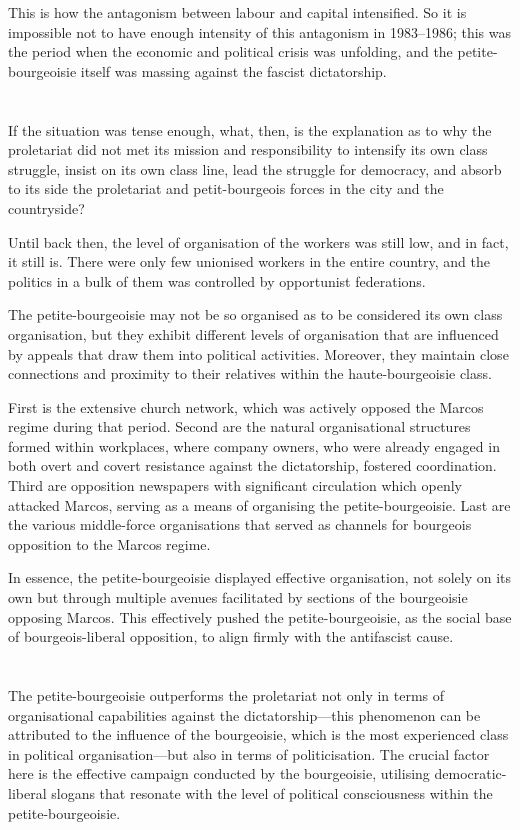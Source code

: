 This is how the antagonism between labour and capital intensified. 
So it is impossible not to have enough 
intensity of this antagonism in 1983--1986;
this was the period when the economic and political crisis was unfolding,
and the petite-bourgeoisie itself was massing against the fascist dictatorship.

\section{}
If the situation was tense enough, 
what, then, is the explanation as to 
why the proletariat did not met its mission and responsibility 
to intensify its own class struggle, 
insist on its own class line, 
lead the struggle for democracy, 
and absorb to its side 
the proletariat and petit-bourgeois forces 
in the city and the countryside?

Until back then, 
the level of organisation of the workers was still low, 
and in fact, it still is. 
There were only few unionised workers in the entire country,
and the politics in a bulk of them was controlled by opportunist federations.

The petite-bourgeoisie may not be so organised 
as to be considered its own class organisation,
but they exhibit different levels of organisation 
that are influenced by appeals 
that draw them into political activities. 
Moreover, 
they maintain close connections and proximity 
to their relatives within the haute-bourgeoisie class.

First is the extensive church network,
which was actively opposed the Marcos regime during that period. 
Second are the natural organisational structures 
formed within workplaces, 
where company owners, who were already engaged 
in both overt and covert resistance 
against the dictatorship, fostered coordination. 
Third are opposition newspapers 
with significant circulation which openly attacked Marcos, 
serving as a means of organising the petite-bourgeoisie. 
Last are the various middle-force organisations 
that served as channels 
for bourgeois opposition to the Marcos regime.

In essence, 
the petite-bourgeoisie displayed effective organisation, 
not solely on its own 
but through multiple avenues facilitated 
by sections of the bourgeoisie opposing Marcos. 
This effectively pushed the petite-bourgeoisie, 
as the social base of bourgeois-liberal opposition, 
to align firmly with the antifascist cause.


\section{}
The petite-bourgeoisie outperforms the proletariat 
not only in terms of organisational capabilities 
against the dictatorship---this 
phenomenon can be attributed 
to the influence of the bourgeoisie, 
which is the most experienced class in political organisation---but 
also in terms of politicisation. 
The crucial factor here 
is the effective campaign conducted by the bourgeoisie, 
utilising democratic-liberal slogans 
that resonate with the level of political consciousness 
within the petite-bourgeoisie.

